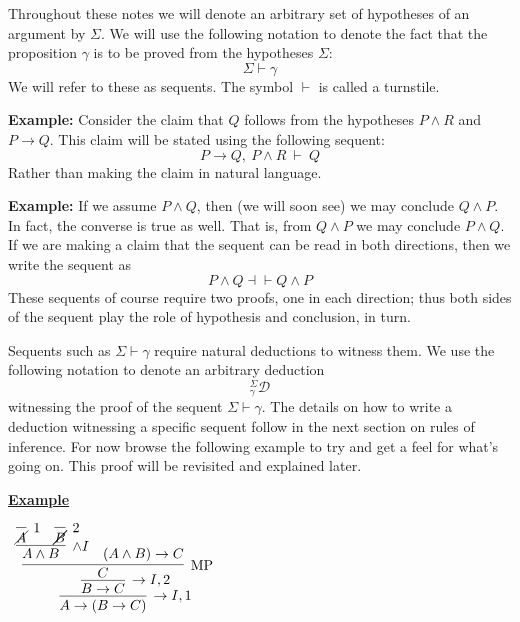 \documentclass{book}
\begin{document}
    Throughout these notes we will denote an arbitrary set of hypotheses of an argument by $\Sigma$. We will use the following notation to denote the fact that the proposition $\gamma$ is to be proved from the hypotheses $\Sigma$: $$\Sigma \vdash \gamma$$ We will refer to these as sequents. The symbol $\vdash$ is called a turnstile. 

    {\bf Example:} Consider the claim that $Q$ follows from the hypotheses $P\land R$ and $P\to Q$. This claim will be stated using the following sequent: $$P \to Q, \ P \land R \ \vdash \ Q$$ Rather than making the claim in natural language. 

    {\bf Example:} If we assume $P \land Q$, then (we will soon see) we may conclude $Q \land P$. In fact, the converse is true as well. That is, from $Q \land P$ we may conclude $P \land Q$. If we are making a claim that the sequent can be read in both directions, then we write the sequent as $$P \land Q \dashv \vdash Q \land P $$ These sequents of course require two proofs, one in each direction; thus both sides of the sequent play the role of hypothesis and conclusion, in turn.

    Sequents such as $\Sigma \vdash \gamma$ require natural deductions to witness them. We use the following notation to denote an arbitrary deduction $$^{\Sigma}_{\gamma}\mathcal{D}$$ witnessing the proof of the sequent $\Sigma \vdash \gamma$. The details on how to write a deduction witnessing a specific sequent follow in the next section on rules of inference. For now browse the following example to try and get a feel for what's going on. This proof will be revisited and explained later. 

    \vspace{0.1cm}

    \begin{mdframed}
        \underline{{\bf Example}} 
            \begin{center}
                $\begin{array}{c}
                    \infer[\to I,1]{A \to (B \to C)}
                        {\infer[\to I,2]{B \to C}
                            {\infer[\MP]{C}
                                {\infer[\land I]{A \land B}
                                    {\infer[1]{\cancel{A}}{} & \infer[2]{\cancel{B}}{}}
                                &							
                                (A \land B) \to C}}}
                \end{array}$
            \end{center}
    \end{mdframed}
\end{document}
